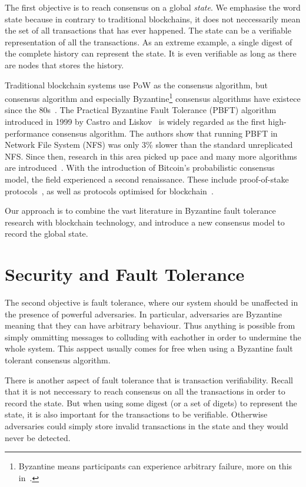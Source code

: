 The first objective is to reach consensus on a global \emph{state}.
We emphasise the word state because in contrary to traditional blockchains,
it does not neccessarily mean the set of all transactions that has ever happened.
The state can be a verifiable representation of all the transactions.
As an extreme example, a single digest of the complete history can represent the state.
It is even verifiable as long as there are nodes that stores the history.

Traditional blockchain systems use PoW as the consensus algorithm,
but consensus algorithm and especially Byzantine\footnote{Byzantine means participants can experience arbitrary failure, more on this in~.}
consensus algorithms have existece since the 80s~\cite{pease1980reaching, lamport1982byzantine}.
The Practical Byzantine Fault Tolerance (PBFT) algorithm introduced in 1999 by Castro and Liskov~\cite{castro1999practical} is widely regarded as the first high-performance consensus algorithm.
The authors show that running PBFT in Network File System (NFS) was only 3\% slower than the standard unreplicated NFS.
Since then, research in this area picked up pace and many more algorithms are introduced~\cite{abd2005fault, kotla2007zyzzyva}.
With the introduction of Bitcoin's probabilistic consensus model, the field experienced a second renaissance.
These include proof-of-stake protocols~\cite{bentov2016snow, micali2016algorand}, as well as protocols optimised for blockchain~\cite{liu2016xft, miller2016honey}.

Our approach is to combine the vast literature in Byzantine fault tolerance research with blockchain technology,
and introduce a new consensus model to record the global state.

\section{Security and Fault Tolerance}

The second objective is fault tolerance,
where our system should be unaffected in the presence of powerful adversaries.
In particular, adversaries are Byzantine meaning that they can have arbitrary behaviour.
Thus anything is possible from simply ommitting messages to colluding with eachother in order to undermine the whole system.
This asppect usually comes for free when using a Byzantine fault tolerant consensus algorithm.

There is another aspect of fault tolerance that is transaction verifiability.
Recall that it is not neccessary to reach consensus on all the transactions in order to record the state.
But when using some digest (or a set of digets) to represent the state, it is also important for the transactions to be verifiable.
Otherwise adversaries could simply store invalid transactions in the state and they would never be detected.

